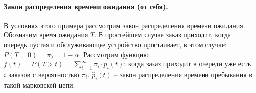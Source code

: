 \paragraph{Закон распределения времени ожидания (от себя).}
В условиях этого примера рассмотрим закон распределения времени ожидания.
Обозначим время ожидания $T$. В простейшем случае заказ приходит, когда
очередь пустая и обслуживающее устройство простаивает, в этом случае:
$P(T = 0) = \pi_0 = 1-\alpha$. Рассмотрим функцию
$f(t) = P(T > t) = \sum_{i=1}^\infty \pi_i \cdot \hat{p}_i (t)$:
когда заказ приходит в очереди уже есть $i$ заказов с вероятностью $\pi_i$.
$\hat{p}_i(t)$ -- %
закон распределения времени пребывания в такой марковской цепи: 
\begin{figure}[h!]
  \centering
\end{figure}

